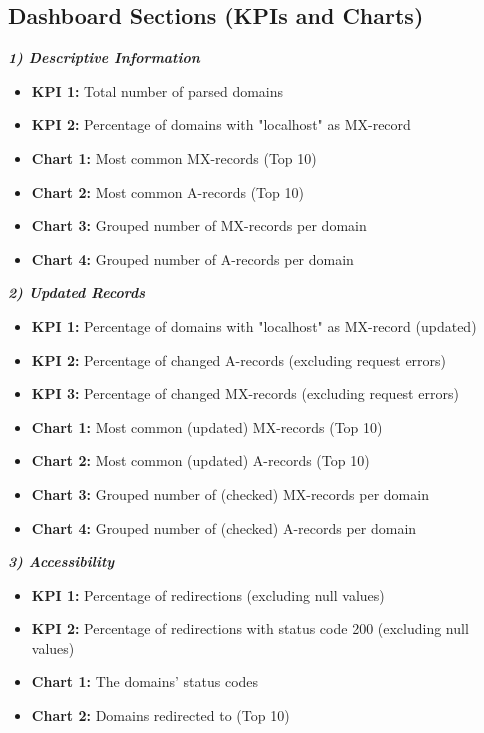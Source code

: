 \subsection{Dashboard Sections (KPIs and Charts)}\label{subsec:dashboard-sections-(kpis-and-charts)}

{\setlength{\parindent}{0cm}\textbf{\textit{1) Descriptive Information}}}
\begin{itemize}
    \item \textbf{KPI 1:} Total number of parsed domains
    \item \textbf{KPI 2:} Percentage of domains with "localhost" as MX-record
    \item \textbf{Chart 1:} Most common MX-records (Top 10)
    \item \textbf{Chart 2:} Most common A-records (Top 10)
    \item \textbf{Chart 3:} Grouped number of MX-records per domain
    \item \textbf{Chart 4:} Grouped number of A-records per domain
\end{itemize}

{\setlength{\parindent}{0cm}\textbf{\textit{2) Updated Records}}}
\begin{itemize}
    \item \textbf{KPI 1:} Percentage of domains with "localhost" as MX-record (updated)
    \item \textbf{KPI 2:} Percentage of changed A-records (excluding request errors)
    \item \textbf{KPI 3:} Percentage of changed MX-records (excluding request errors)
    \item \textbf{Chart 1:} Most common (updated) MX-records (Top 10)
    \item \textbf{Chart 2:} Most common (updated) A-records (Top 10)
    \item \textbf{Chart 3:} Grouped number of (checked) MX-records per domain
    \item \textbf{Chart 4:} Grouped number of (checked) A-records per domain
\end{itemize}

{\setlength{\parindent}{0cm}\textbf{\textit{3) Accessibility}}}
\begin{itemize}
    \item \textbf{KPI 1:} Percentage of redirections (excluding null values)
    \item \textbf{KPI 2:} Percentage of redirections with status code 200 (excluding null values)
    \item \textbf{Chart 1:} The domains' status codes
    \item \textbf{Chart 2:} Domains redirected to (Top 10)
\end{itemize}

